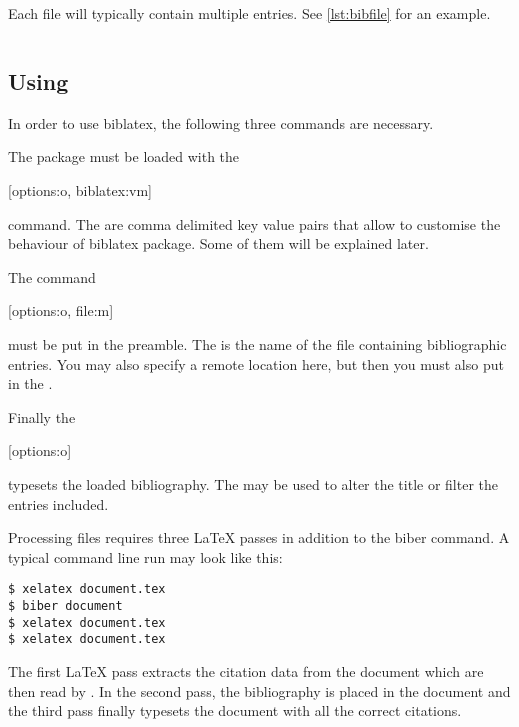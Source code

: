 Each  file will typically contain multiple entries. See
\autoref{lst:bibfile} for an example.

\begin{listing}[htp]
  \begin{lined}{\textwidth}
    \inputminted{bibtex}{src/examples/example.bib}
  \end{lined}
  \caption[An example of bibliography database]{An example bibliography
    database for  ( file)}\label{lst:bibfile}
\end{listing}

\subsection{Using }

In order to use biblatex, the following three commands are necessary.

The  package must be loaded with the
\begin{lscommand}
  [options:o, biblatex:vm]
\end{lscommand}
command. The  are comma delimited key value pairs that allow to
customise the behaviour of biblatex package. Some of them will be explained
later.

The command
\begin{lscommand}
  [options:o, file:m]
\end{lscommand}
must be put in the preamble. The  is the name of the  file
containing bibliographic entries. You may also specify a remote location here,
but then you must also put  in the .

Finally the
\begin{lscommand}
  [options:o]
\end{lscommand}
typesets the loaded bibliography. The  may be used to alter the
title or filter the entries included.

Processing files requires three \LaTeX{} passes in addition to the biber
command. A typical command line run may look like this:
\begin{code}
\begin{verbatim}
$ xelatex document.tex
$ biber document
$ xelatex document.tex
$ xelatex document.tex
\end{verbatim}
\end{code}
The first \LaTeX{} pass extracts the citation data from the document which are
then read by . In the second pass, the bibliography is placed in the
document and the third pass finally typesets the document with all the correct citations.

